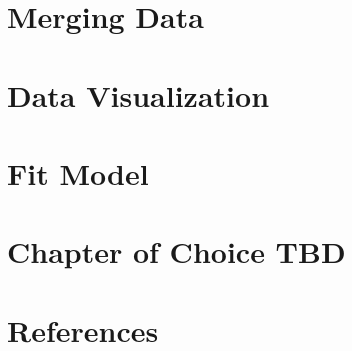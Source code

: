 \documentclass[
]{article}
\begin{document}
\pagebreak

\hypertarget{merging-data}{%
\section{Merging Data}\label{merging-data}}

\pagebreak

\hypertarget{data-visualization}{%
\section{Data Visualization}\label{data-visualization}}

\pagebreak

\hypertarget{fit-model}{%
\section{Fit Model}\label{fit-model}}

\pagebreak

\hypertarget{chapter-of-choice-tbd}{%
\section{Chapter of Choice TBD}\label{chapter-of-choice-tbd}}

\pagebreak

\hypertarget{references}{%
\section{References}\label{references}}
\end{document}
